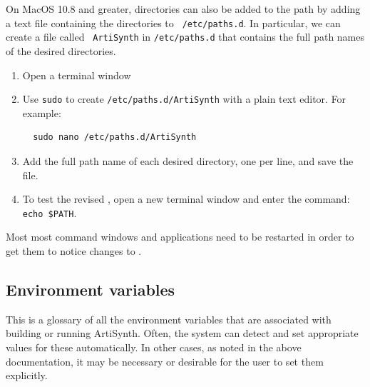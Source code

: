 \ifMacOS
On MacOS 10.8 and greater, directories can also be added to the
path by adding a text file containing the directories to {\tt
/etc/paths.d}.  In particular, we can create a file called {\tt
ArtiSynth} in {\tt /etc/paths.d} that contains the full path names of
the desired directories.

\begin{enumerate}

\item Open a terminal window

\item Use {\tt sudo} to create {\tt /etc/paths.d/ArtiSynth} with a plain
text editor. For example:
\begin{verbatim}
  sudo nano /etc/paths.d/ArtiSynth
\end{verbatim}

\item Add the full path name of each desired directory, one per line,
and save the file.

\item To test the revised \PATH{}, open a new terminal
window and enter the command: {\tt echo \$PATH}.

\end{enumerate}

\fi %
\fi %

\begin{sideblock}
Most most command windows and applications need to be restarted in
order to get them to notice changes to \PATH{}.
\end{sideblock}

\subsection{Environment variables}
\label{EnvironmentVariables}

This is a glossary of all the environment variables that are
associated with building or running ArtiSynth. Often, the system can
detect and set appropriate values for these automatically. In other
cases, as noted in the above documentation, it may be necessary or
desirable for the user to set them explicitly.

